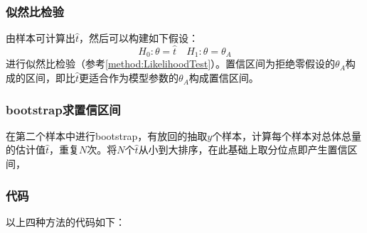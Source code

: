 \subsubsection{似然比检验}
由样本可计算出$\hat{t}$，然后可以构建如下假设：
\begin{equation*}
	H_0:\theta=\hat{t}\quad H_1:\theta=\theta_A
\end{equation*}
进行似然比检验（参考\ref{method:LikelihoodTest}）。置信区间为拒绝零假设的$\theta_A$构成的区间，即比$\hat{t}$更适合作为模型参数的$\theta_A$构成置信区间。
\subsubsection{bootstrap求置信区间}
在第二个样本中进行bootstrap，有放回的抽取$y$个样本，计算每个样本对总体总量的估计值$\hat{t}$，重复$N$次。将$N$个$\hat{t}$从小到大排序，在此基础上取分位点即产生置信区间，
\subsubsection{代码}
以上四种方法的代码如下：
\inputminted[bgcolor=white, linenos, frame=single, numbersep=5pt, breaklines]{r}{sampling-method/tag-recapture/tag-recapture.R}